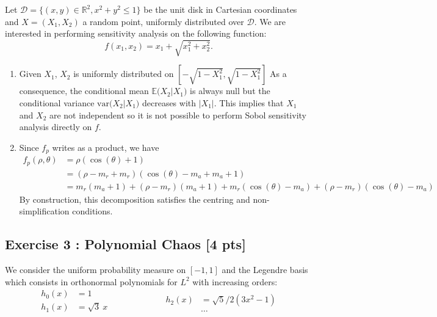 \documentclass[a4paper,10pt]{article}
\newcommand{\Disk}{\mathcal{D}}
\begin{document}
Let $\Disk = \lbrace\left( x, y \right) \in \mathbb{R}^2, x^2 + y^2 \leq 1\rbrace$ be the unit disk in Cartesian coordinates and $X = \left(X_1, X_2\right)$ a random point, uniformly distributed over $\Disk$. We are interested in performing sensitivity analysis on the following function:
\begin{equation*}
  f(x_1,x_2) = x_1 + \sqrt{x_1^2 + x_2^2}.
\end{equation*}

\begin{enumerate}[label=Q\arabic*.]
\item Given $X_1$, $X_2$ is uniformly distributed on $\left[-\sqrt{1-X_1^2},\sqrt{1-X_1^2} \right]$ As a consequence, the conditional mean $\mathbb{E} \big(X_2 \vert X_1 \big)$ is always null but the conditional variance $\mathrm{var} \big(X_2 \vert X_1 \big)$ decreases with $|X_1|$. This implies that $X_1$ and $X_2$ are not independent so it is not possible to perform Sobol sensitivity analysis directly on $f$.
\item Since $f_p$ writes as a product, we have
\begin{align*}
  f_p(\rho,\theta) &= \rho (\cos(\theta) + 1)\\
  &= (\rho-m_r+m_r) (\cos(\theta) - m_a + m_a + 1)\\
  &= m_r ( m_a + 1) + (\rho-m_r) (m_a + 1) + m_r (\cos(\theta) - m_a) + (\rho-m_r) (\cos(\theta) - m_a)
\end{align*}
By construction, this decomposition satisfies the centring and non-simplification conditions.
\end{enumerate}

\subsection*{Exercise 3 : Polynomial Chaos \hfill [4 pts]}
We consider the uniform probability measure on $[-1,1]$ and the Legendre basis which consists in orthonormal polynomials for $L^2$ with increasing orders:
\begin{equation*}
  \begin{split}
    h_{0}(x) & = 1 \\
    h_{1}(x) & = \sqrt{3}\ x \\
  \end{split}
  \qquad \qquad \qquad 
  \begin{split}
    h_{2}(x) & = \sqrt{5}/2 (3x^2 -1) \\
     & \dots 
  \end{split}
\end{equation*}
\end{document}
